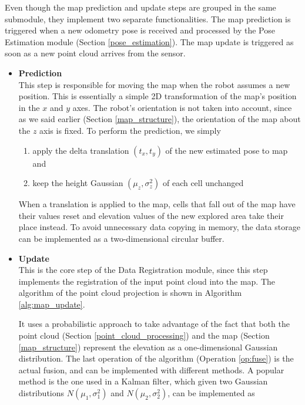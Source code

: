 Even though the map prediction and update steps are grouped in the
same submodule, they implement two separate functionalities.
The map prediction is triggered when a new odometry pose is received and
processed by the Pose Estimation module (Section \ref{pose_estimation}).
The map update is triggered as soon as a new point cloud arrives from
the sensor.
\begin{itemize}[listparindent=1.5em]
    \item \textbf{Prediction} \\
        This step is responsible for moving the map when the robot assumes
        a new position.
        This is essentially a simple 2D transformation of the map's position
        in the $x$ and $y$ axes.
        The robot's orientation is not taken into account, since as we said
        earlier (Section \ref{map_structure}), the orientation of the map
        about the $z$ axis is fixed.
        To perform the prediction, we simply

        \begin{enumerate}
            \item apply the delta translation $(t_x,t_y)$ of the
                new estimated pose to map and
            \item keep the height Gaussian $(\mu_z,\sigma^2_z)$ of
                each cell unchanged
        \end{enumerate}

        When a translation is applied to the map, cells that fall out of the
        map have their values reset and elevation values of the new explored
        area take their place instead.
        To avoid unnecessary data copying in memory, the data storage can be
        implemented as a two-dimensional circular buffer.

    \item \label{map_update} \textbf{Update} \\
        This is the core step of the Data Registration module, since this
        step implements the registration of the input point cloud into the map.
        The algorithm of the point cloud projection is shown in Algorithm
        \ref{alg:map_update}.

        It uses a probabilistic approach to take advantage of the
        fact that both the point cloud (Section \ref{point_cloud_processing})
        and the map (Section \ref{map_structure}) represent the elevation
        as a one-dimensional Gaussian distribution.
        The last operation of the algorithm (Operation \ref{op:fuse}) is the
        actual fusion, and can be implemented with different methods.
        A popular method is the one used in a Kalman filter, which given
        two Gaussian distributions $N(\mu_1, \sigma^2_1)$ and
        $N(\mu_2, \sigma^2_2)$, can be implemented as


\end{itemize}
